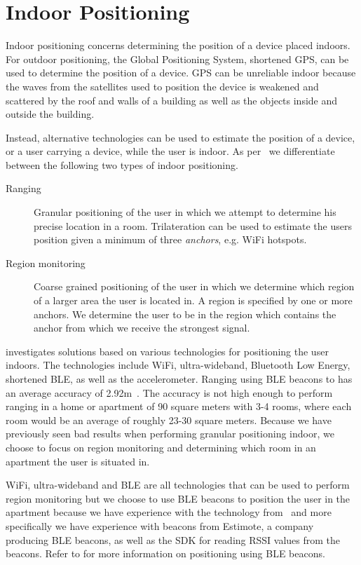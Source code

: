 \section{Indoor Positioning}
\label{sec:analysis:indoor-positioning}

Indoor positioning concerns determining the position of a device placed indoors. For outdoor positioning, the Global Positioning System, shortened GPS, can be used to determine the position of a device. GPS can be unreliable indoor because the waves from the satellites used to position the device is weakened and scattered by the roof and walls of a building as well as the objects inside and outside the building.

Instead, alternative technologies can be used to estimate the position of a device, or a user carrying a device, while the user is indoor. As per~\cite{prespecialisation} we differentiate between the following two types of indoor positioning.

\begin{description}
\item[Ranging] Granular positioning of the user in which we attempt to determine his precise location in a room. Trilateration can be used to estimate the users position given a minimum of three \emph{anchors}, e.g. WiFi hotspots.
\item[Region monitoring] Coarse grained positioning of the user in which we determine which region of a larger area the user is located in. A region is specified by one or more anchors. We determine the user to be in the region which contains the anchor from which we receive the strongest signal.
\end{description}

\cite{prespecialisation} investigates solutions based on various technologies for positioning the user indoors. The technologies include WiFi, ultra-wideband, Bluetooth Low Energy, shortened BLE, as well as the accelerometer. Ranging using BLE beacons to has an average accuracy of 2.92m~\cite[p. 63]{prespecialisation}. The accuracy is not high enough to perform ranging in a home or apartment of 90 square meters with 3-4 rooms, where each room would be an average of roughly 23-30 square meters. Because we have previously seen bad results when performing granular positioning indoor, we choose to focus on region monitoring and determining which room in an apartment the user is situated in.

WiFi, ultra-wideband and BLE are all technologies that can be used to perform region monitoring but we choose to use BLE beacons to position the user in the apartment because we have experience with the technology from~\cite{prespecialisation} and more specifically we have experience with beacons from Estimote, a company producing BLE beacons, as well as the SDK for reading RSSI values from the beacons. Refer to  for more information on positioning using BLE beacons.

